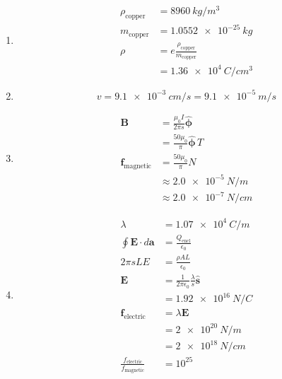 \documentclass{article}
\renewcommand{\vec}[1]{\boldsymbol{\mathbf{#1}}}
\newcommand{\uvec}[1]{\hat{\vec{#1}}}
\begin{document}
\begin{enumerate}
  \item

        \begin{align*}
          \rho_\text{copper} & = \qty{8960}{kg/m^3}                           \\
          m_\text{copper}    & = \qty{1.0552e-25}{kg}                         \\
          \rho               & = e \frac{\rho_\text{copper}}{m_\text{copper}} \\
                             & = \qty{1.36e4}{C/cm^3}
        \end{align*}

  \item \[v = \qty{9.1e-3}{cm/s} = \qty{9.1e-5}{m/s}\]

  \item

        \begin{align*}
          \vec{B}                 & = \frac{\mu_0 I}{2 \pi s} \uvec{\phi}         \\
                                  & = \frac{50 \mu_0}{\pi} \uvec{\phi} \,\unit{T} \\
          \vec{f}_\text{magnetic} & = \frac{50 \mu_0}{\pi} \unit{N}               \\
                                  & \approx \qty{2.0e-5}{N/m}                     \\
                                  & \approx \qty{2.0e-7}{N/cm}
        \end{align*}

  \item

        \begin{align*}
          \lambda                                     & = \qty{1.07e4}{C/m}                                     \\
          \oint \vec{E} \cdot d \vec{a}               & = \frac{Q_\text{encl}}{\epsilon_0}                      \\
          2 \pi s L E                                 & = \frac{\rho A L}{\epsilon_0}                           \\
          \vec{E}                                     & = \frac{1}{2 \pi \epsilon_0} \frac{\lambda}{s} \uvec{s} \\
                                                      & = \qty{1.92e16}{N/C}                                    \\
          \vec{f}_\text{electric}                     & = \lambda \vec{E}                                       \\
                                                      & = \qty{2e20}{N/m}                                       \\
                                                      & = \qty{2e18}{N/cm}                                      \\
          \frac{f_\text{electric}}{f_\text{magnetic}} & = 10^{25}
        \end{align*}
\end{enumerate}
\end{document}
